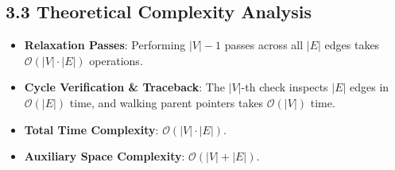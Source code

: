 \documentclass[12pt]{article}
\begin{document}
\subsection*{3.3 Theoretical Complexity Analysis}
\begin{itemize}
    \item \textbf{Relaxation Passes}: Performing $|V| - 1$ passes across all $|E|$ edges takes $\mathcal{O}(|V| \cdot |E|)$ operations.
    \item \textbf{Cycle Verification \& Traceback}: The $|V|$-th check inspects $|E|$ edges in $\mathcal{O}(|E|)$ time, and walking parent pointers takes $\mathcal{O}(|V|)$ time.
    \item \textbf{Total Time Complexity}: $\mathcal{O}(|V| \cdot |E|)$.
    \item \textbf{Auxiliary Space Complexity}: $\mathcal{O}(|V| + |E|)$.
\end{itemize}
\end{document}
